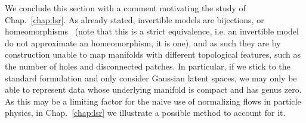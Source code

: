 We conclude this section with a comment motivating the study of Chap.~\ref{chap:lsr}. As already stated, invertible models are bijections, or homeomorphisms~\cite{dupont2019augmented,  huang2020augmented} (note that this is a strict equivalence, i.e. an invertible model do not approximate an homeomorphism, it is one), and as such they are by construction unable to map manifolds with different topological features, such as the number of holes and disconnected patches. In particular, if we stick to the standard formulation and only consider Gaussian latent spaces, we may only be able to represent data whose underlying manifold is compact and has genus zero. As this may be a limiting factor for the naive use of normalizing flows in particle physics, in Chap.~\ref{chap:lsr} we illustrate a possible method to account for it.

